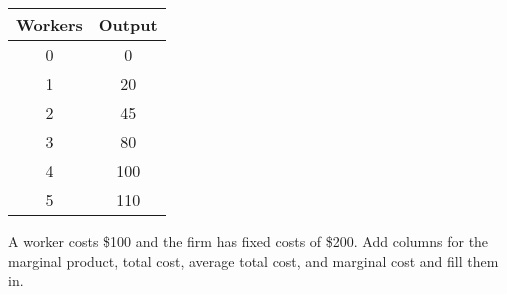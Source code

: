 \documentclass[12pt]{article}
\begin{document}
\begin{table}[H]
        \centering
        \begin{tabular}{cc}
            Workers & Output \\
            \hline
            0 & 0 \\
            1 & 20 \\
            2 & 45 \\
            3 & 80 \\
            4 & 100 \\
            5 & 110 \\
        \end{tabular}

        \label{tab:placeholder}
    \end{table}
    
     A worker costs \$100 and the firm has fixed costs of \$200. Add columns for the marginal product, total cost, average total cost, and marginal cost and fill them in.
    
\end{document}
